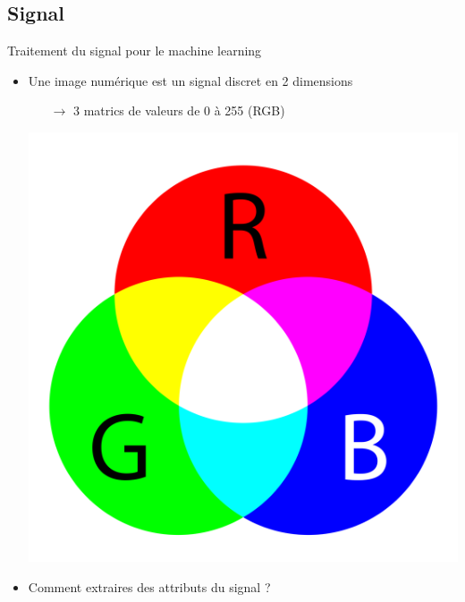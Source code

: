 \documentclass[compress]{beamer}
\begin{document}
\subsection{Signal}
\begin{frame}{Traitement du signal pour le machine learning}
  \begin{itemize}
    \item Une image numérique est un signal discret en 2 dimensions
    \begin{itemize}
      \item[$\rightarrow$] 3 matrics de valeurs de 0 à 255 (RGB)
    \end{itemize}
    \begin{center}
      \includegraphics[width=0.3\linewidth]{resources/RGB}
    \end{center}
    \item Comment extraires des attributs du signal ?
  \end{itemize}
\end{frame}
\end{document}
